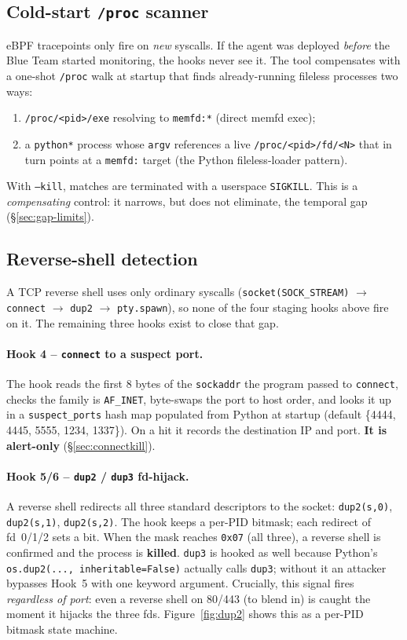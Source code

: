 \documentclass[11pt]{article}
\newcommand{\co}[1]{\texttt{#1}}
\begin{document}
\subsection{Cold-start \co{/proc} scanner}
\label{sec:coldstart}
eBPF tracepoints only fire on \emph{new} syscalls. If the agent was deployed
\emph{before} the Blue Team started monitoring, the hooks never see it. The
tool compensates with a one-shot \co{/proc} walk at startup that finds
already-running fileless processes two ways:
\begin{enumerate}[leftmargin=1.4em]
  \item \co{/proc/<pid>/exe} resolving to \co{memfd:*} (direct memfd exec);
  \item a \co{python*} process whose \co{argv} references a live
        \co{/proc/<pid>/fd/<N>} that in turn points at a \co{memfd:} target
        (the Python fileless-loader pattern).
\end{enumerate}
With \co{--kill}, matches are terminated with a userspace \co{SIGKILL}. This
is a \emph{compensating} control: it narrows, but does not eliminate, the
temporal gap (\S\ref{sec:gap-limits}).

\subsection{Reverse-shell detection}
A TCP reverse shell uses only ordinary syscalls
(\co{socket(SOCK\_STREAM)} $\to$ \co{connect} $\to$ \co{dup2} $\to$
\co{pty.spawn}), so none of the four staging hooks above fire on it. The
remaining three hooks exist to close that gap.

\paragraph{Hook 4 -- \co{connect} to a suspect port.}
The hook reads the first 8 bytes of the \co{sockaddr} the program passed to
\co{connect}, checks the family is \co{AF\_INET}, byte-swaps the port to host
order, and looks it up in a \co{suspect\_ports} hash map populated from
Python at startup (default \{4444, 4445, 5555, 1234, 1337\}). On a hit it
records the destination IP and port. \textbf{It is alert-only}
(\S\ref{sec:connectkill}).

\paragraph{Hook 5/6 -- \co{dup2} / \co{dup3} fd-hijack.}
A reverse shell redirects all three standard descriptors to the socket:
\co{dup2(s,0)}, \co{dup2(s,1)}, \co{dup2(s,2)}. The hook keeps a per-PID
bitmask; each redirect of fd~0/1/2 sets a bit. When the mask reaches
\co{0x07} (all three), a reverse shell is confirmed and the process is
\textbf{killed}. \co{dup3} is hooked as well because Python's
\co{os.dup2(..., inheritable=False)} actually calls \co{dup3}; without it an
attacker bypasses Hook~5 with one keyword argument. Crucially, this signal
fires \emph{regardless of port}: even a reverse shell on 80/443 (to blend
in) is caught the moment it hijacks the three fds.
Figure~\ref{fig:dup2} shows this as a per-PID bitmask state machine.
\end{document}
